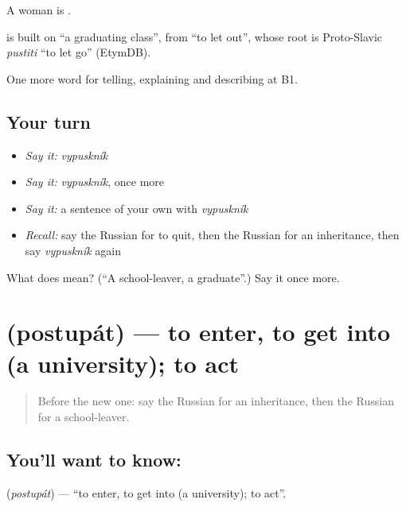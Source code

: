 A woman is \emph{}.

\begin{cousinweb}
\emph{} is built on \emph{} \textquotedblleft{}a graduating class\textquotedblright{}, from \emph{} \textquotedblleft{}to let out\textquotedblright{}, whose root is Proto-Slavic \emph{pustiti} \textquotedblleft{}to let go\textquotedblright{} (EtymDB).
\end{cousinweb}

\begin{grammarlens}[title={What you've built}]
One more word for telling, explaining and describing at B1.
\end{grammarlens}

\subsection*{Your turn}
\begin{itemize}
\raggedright
  \item \emph{Say it:} \emph{vypuskník}
  \item \emph{Say it:} \emph{vypuskník}, once more
  \item \emph{Say it:} a sentence of your own with \emph{vypuskník}
  \item \emph{Recall:} say the Russian for to quit, then the Russian for an inheritance, then say \emph{vypuskník} again
\end{itemize}

\begin{tcolorbox}[breakable,colback=teal!4,colframe=teal!35!black,title={Before you move on}]
What does  mean? (\textquotedblleft{}A school-leaver, a graduate\textquotedblright{}.) Say it once more.
\end{tcolorbox}
\section[\texorpdfstring{\ru{поступать} (postupát)}{поступать (postupát)}]{ (postupát) — to enter, to get into (a university); to act}

\label{lesson:RU-C308-postupat}



\begin{quote}
Before the new one: say the Russian for an inheritance, then the Russian for a school-leaver.
\end{quote}

\subsection*{You'll want to know: }
\textbf{} (\emph{postupát}) — \textquotedblleft{}to enter, to get into (a university); to act\textquotedblright{}.

